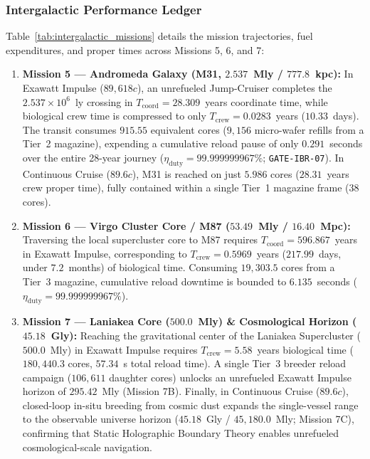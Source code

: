 \documentclass[11pt,onecolumn]{article}
\begin{document}
\subsubsection{Intergalactic Performance Ledger}
Table~\ref{tab:intergalactic_missions} details the mission trajectories, fuel expenditures, and proper times across Missions 5, 6, and 7:
\begin{enumerate}
  \item \textbf{Mission 5 --- Andromeda Galaxy (M31, $2.537$~Mly / $777.8$~kpc):} In Exawatt Impulse ($89{,}618c$), an unrefueled Jump-Cruiser completes the $2.537\times 10^6$~ly crossing in $T_{\mathrm{coord}} = 28.309$~years coordinate time, while biological crew time is compressed to only $T_{\mathrm{crew}} = 0.0283$~years ($10.33$~days). The transit consumes $915.55$ equivalent cores ($9{,}156$ micro-wafer refills from a Tier~2 magazine), expending a cumulative reload pause of only $0.291$~seconds over the entire 28-year journey ($\eta_{\mathrm{duty}} = 99.999999967\%$; \texttt{GATE-IBR-07}). In Continuous Cruise ($89.6c$), M31 is reached on just $5.986$ cores ($28.31$~years crew proper time), fully contained within a single Tier~1 magazine frame ($38$ cores).
  \item \textbf{Mission 6 --- Virgo Cluster Core / M87 ($53.49$~Mly / $16.40$~Mpc):} Traversing the local supercluster core to M87 requires $T_{\mathrm{coord}} = 596.867$~years in Exawatt Impulse, corresponding to $T_{\mathrm{crew}} = 0.5969$~years ($217.99$~days, under $7.2$~months) of biological time. Consuming $19{,}303.5$ cores from a Tier~3 magazine, cumulative reload downtime is bounded to $6.135$~seconds ($\eta_{\mathrm{duty}} = 99.999999967\%$).
  \item \textbf{Mission 7 --- Laniakea Core ($500.0$~Mly) \& Cosmological Horizon ($45.18$~Gly):} Reaching the gravitational center of the Laniakea Supercluster ($500.0$~Mly) in Exawatt Impulse requires $T_{\mathrm{crew}} = 5.58$~years biological time ($180{,}440.3$ cores, $57.34$~s total reload time). A single Tier~3 breeder reload campaign ($106{,}611$ daughter cores) unlocks an unrefueled Exawatt Impulse horizon of $295.42$~Mly (Mission 7B). Finally, in Continuous Cruise ($89.6c$), closed-loop in-situ breeding from cosmic dust expands the single-vessel range to the observable universe horizon ($45.18$~Gly / $45{,}180.0$~Mly; Mission 7C), confirming that Static Holographic Boundary Theory enables unrefueled cosmological-scale navigation.
\end{enumerate}
\end{document}
